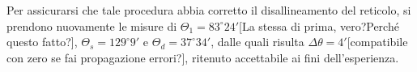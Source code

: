 \documentclass{article}
\begin{document}
	Per assicurarsi che tale procedura abbia corretto il disallineamento del reticolo, si prendono nuovamente le misure di $\Theta_1 = 83^\circ 24'$[La stessa di prima, vero?Perché questo fatto?], $\Theta_s = 129^\circ 9'$ e $\Theta_d = 37^\circ 34'$, dalle quali risulta $\Delta\theta = 4'$[compatibile con zero se fai propagazione errori?], ritenuto accettabile ai fini dell'esperienza. 
	
	
	
\end{document}
